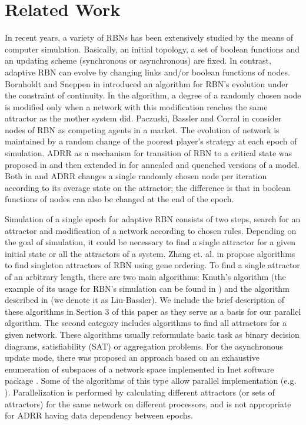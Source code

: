 \documentclass[procedia]{easychair}
\begin{document}
	\section{Related Work}
	\label{sect:related-work}
	In recent years, a variety of RBNs has been extensively studied by the means of computer simulation. Basically, an initial topology, a set of boolean functions and an updating scheme (synchronous or asynchronous) \cite{gershenson04} are fixed. In contrast, adaptive RBN can evolve by changing links and/or boolean functions of nodes. Bornholdt and Sneppen in \cite{bornholdt1998neutral} introduced an algorithm for RBN's evolution under the constraint of continuity. In the algorithm, a degree of a randomly chosen node is modified only when a network with this modification reaches the same attractor as the mother system did. Paczuski, Bassler and Corral in \cite{paczuski2000self} consider nodes of RBN as competing agents in a market. The evolution of network is maintained by a random change of the poorest player's strategy at each epoch of simulation. ADRR as a mechanism for transition of RBN to a critical state was proposed in \cite{bornholdt2000topological} and then extended in \cite{mlb} for annealed and quenched versions of a model. Both in  \cite{bornholdt2000topological} and \cite{mlb} ADRR changes a single randomly chosen node per iteration according to its average state on the attractor; the difference is that in \cite{mlb} boolean functions of nodes can also be changed at the end of the epoch. 
	
	Simulation of a single epoch for adaptive RBN consists of two steps, search for an attractor and modification of a network according to chosen rules. Depending on the goal of simulation, it could be necessary to find a single attractor for a given initial state or all the attractors of a system. Zhang et. al. in \cite{zhang2007algorithms} propose algorithms to find singleton attractors of RBN using gene ordering. To find a single attractor of an arbitrary length, there are two main algorithms: Knuth's algorithm \cite{knuth1981art} (the example of its usage for RBN's simulation can be found in \cite{bhattacharjya1996median}) and the algorithm described in \cite{mlb} (we denote it as Liu-Bassler). We include the brief description of these algorithms in Section 3 of this paper as they serve as a basis for our parallel algorithm. The second category includes algorithms to find all attractors for a given network. These algorithms usually reformulate basic task as binary decision diagrams, satisfiability (SAT) or aggregation problems. For the asynchronous update mode, there was proposed an approach based on an exhaustive enumeration of subspaces of a network space implemented in Inet software package \cite{berntenis2013detection}. Some of the algorithms of this type allow parallel implementation (e.g. \cite{guo2014parallel}). Parallelization is performed by calculating different attractors (or sets of attractors) for the same network on different processors, and is not appropriate for ADRR having data dependency between epochs. 
	
\end{document}
